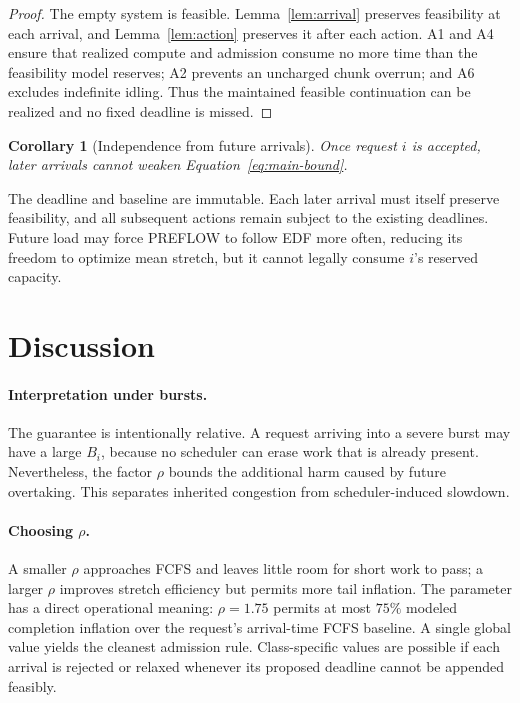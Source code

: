 \documentclass{article}
\newtheorem{corollary}{Corollary}
\newcommand{\preflow}{\textnormal{\textsc{PREFLOW}}}
\begin{document}
\begin{proof}
The empty system is feasible.  Lemma~\ref{lem:arrival} preserves feasibility at
each arrival, and Lemma~\ref{lem:action} preserves it after each action.  A1 and
A4 ensure that realized compute and admission consume no more time than the
feasibility model reserves; A2 prevents an uncharged chunk overrun; and A6
excludes indefinite idling.  Thus the maintained feasible continuation can be
realized and no fixed deadline is missed.
\end{proof}

\begin{corollary}[Independence from future arrivals]
Once request $i$ is accepted, later arrivals cannot weaken
Equation~\eqref{eq:main-bound}.
\end{corollary}

The deadline and baseline are immutable.  Each later arrival must itself
preserve feasibility, and all subsequent actions remain subject to the existing
deadlines.  Future load may force \preflow{} to follow EDF more often, reducing
its freedom to optimize mean stretch, but it cannot legally consume $i$'s
reserved capacity.

\section{Discussion}
\label{sec:discussion}

\paragraph{Interpretation under bursts.}
The guarantee is intentionally relative.  A request arriving into a severe
burst may have a large $B_i$, because no scheduler can erase work that is
already present.  Nevertheless, the factor $\rho$ bounds the additional harm
caused by future overtaking.  This separates inherited congestion from
scheduler-induced slowdown.

\paragraph{Choosing $\rho$.}
A smaller $\rho$ approaches FCFS and leaves little room for short work to pass;
a larger $\rho$ improves stretch efficiency but permits more tail inflation.
The parameter has a direct operational meaning: $\rho=1.75$ permits at most
$75\%$ modeled completion inflation over the request's arrival-time FCFS
baseline.  A single global value yields the cleanest admission rule.
Class-specific values are possible if each arrival is rejected or relaxed
whenever its proposed deadline cannot be appended feasibly.
\end{document}

